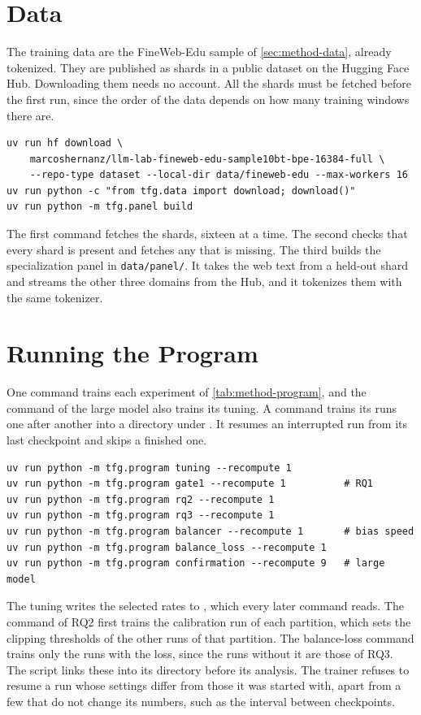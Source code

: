 \section{Data}
\label{app:reproduction-data}
The training data are the FineWeb-Edu sample of \cref{sec:method-data}, already tokenized. They are published as shards in a public dataset on the Hugging Face Hub. Downloading them needs no account. All the shards must be fetched before the first run, since the order of the data depends on how many training windows there are.
\begin{verbatim}
uv run hf download \
    marcoshernanz/llm-lab-fineweb-edu-sample10bt-bpe-16384-full \
    --repo-type dataset --local-dir data/fineweb-edu --max-workers 16
uv run python -c "from tfg.data import download; download()"
uv run python -m tfg.panel build
\end{verbatim}
The first command fetches the shards, sixteen at a time. The second checks that every shard is present and fetches any that is missing. The third builds the specialization panel in \texttt{data/panel/}. It takes the web text from a held-out shard and streams the other three domains from the Hub, and it tokenizes them with the same tokenizer.

\section{Running the Program}
\label{app:reproduction-program}
One command trains each experiment of \cref{tab:method-program}, and the command of the large model also trains its tuning. A command trains its runs one after another into a directory under . It resumes an interrupted run from its last checkpoint and skips a finished one.
\begin{verbatim}
uv run python -m tfg.program tuning --recompute 1
uv run python -m tfg.program gate1 --recompute 1          # RQ1
uv run python -m tfg.program rq2 --recompute 1
uv run python -m tfg.program rq3 --recompute 1
uv run python -m tfg.program balancer --recompute 1       # bias speed
uv run python -m tfg.program balance_loss --recompute 1
uv run python -m tfg.program confirmation --recompute 9   # large model
\end{verbatim}
The tuning writes the selected rates to \code{runs/tuning/rates.json}, which every later command reads. The command of RQ2 first trains the calibration run of each partition, which sets the clipping thresholds of the other runs of that partition. The balance-loss command trains only the runs with the loss, since the runs without it are those of RQ3. The script  links these into its directory before its analysis. The trainer refuses to resume a run whose settings differ from those it was started with, apart from a few that do not change its numbers, such as the interval between checkpoints.


